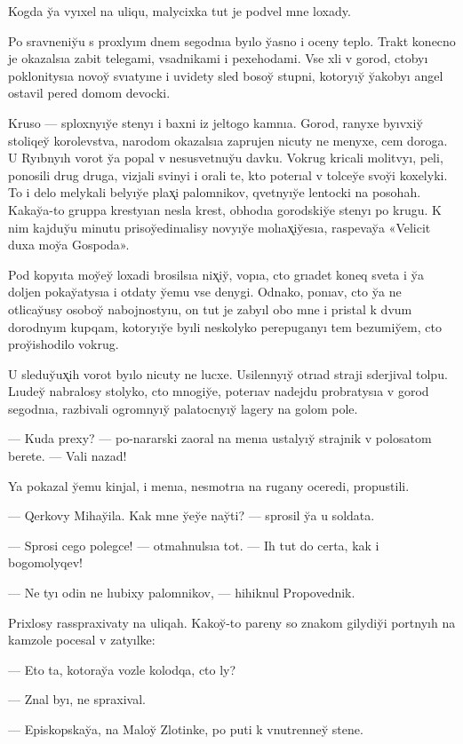 \documentclass[10pt]{book}
\begin{document}
Kogda y̆a vyıxel na uliqu, malycixka tut je podvel mne loxady.

Po sravneniy̆u s proxlyım dnem segodnıa byılo y̆asno i oceny teplo. Trakt konecno je okazalsıa zabit telegami, vsadnikami i pexehodami. Vse xli v gorod, ctobyı poklonitysıa novoy̆ svıatyıne i uvidety sled bosoy̆ stupni, kotoryıy̆ y̆akobyı angel ostavil pered domom devocki.

Kruso — sploxnyıy̆e stenyı i baxni iz jeltogo kamnıa. Gorod, ranyxe byıvxiy̆ stoliqey̆ korolevstva, narodom okazalsıa zaprujen nicuty ne menyxe, cem doroga. U Ryıbnyıh vorot y̆a popal v nesusvetnuy̆u davku. Vokrug kricali molitvyı, peli, ponosili drug druga, vizjali svinyi i orali te, kto poterıal v tolcey̆e svoy̆i koxelyki. To i delo melykali belyıy̆e plax̨i palomnikov, qvetnyıy̆e lentocki na posohah. Kakay̆a-to gruppa krestyıan nesla krest, obhodıa gorodskiy̆e stenyı po krugu. K nim kajduy̆u minutu prisoy̆edinıalisy novyıy̆e molıax̨iy̆esıa, raspevay̆a «Velicit duxa moy̆a Gospoda».

Pod kopyıta moy̆ey̆ loxadi brosilsıa nix̨iy̆, vopıa, cto grıadet koneq sveta i y̆a doljen pokay̆atysıa i otdaty y̆emu vse denygi. Odnako, ponıav, cto y̆a ne otlicay̆usy osoboy̆ nabojnostyıu, on tut je zabyıl obo mne i pristal k dvum dorodnyım kupqam, kotoryıy̆e byıli neskolyko perepuganyı tem bezumiy̆em, cto proy̆ishodilo vokrug.

U sleduy̆ux̨ih vorot byılo nicuty ne lucxe. Usilennyıy̆ otrıad straji sderjival tolpu. Lıudey̆ nabralosy stolyko, cto mnogiy̆e, poterıav nadejdu probratysıa v gorod segodnıa, razbivali ogromnyıy̆ palatocnyıy̆ lagery na golom pole.

— Kuda prexy? — po-nararski zaoral na menıa ustalyıy̆ strajnik v polosatom berete. — Vali nazad!

Ya pokazal y̆emu kinjal, i menıa, nesmotrıa na rugany oceredi, propustili.

— Qerkovy Mihay̆ila. Kak mne y̆ey̆e nay̆ti? — sprosil y̆a u soldata.

— Sprosi cego polegce! — otmahnulsıa tot. — Ih tut do certa, kak i bogomolyqev!

— Ne tyı odin ne lıubixy palomnikov, — hihiknul Propovednik.

Prixlosy rasspraxivaty na uliqah. Kakoy̆-to pareny so znakom gilydiy̆i portnyıh na kamzole pocesal v zatyılke:

— Eto ta, kotoray̆a vozle kolodqa, cto ly?

— Znal byı, ne spraxival.

— Episkopskay̆a, na Maloy̆ Zlotinke, po puti k vnutrenney̆ stene.
\end{document}
